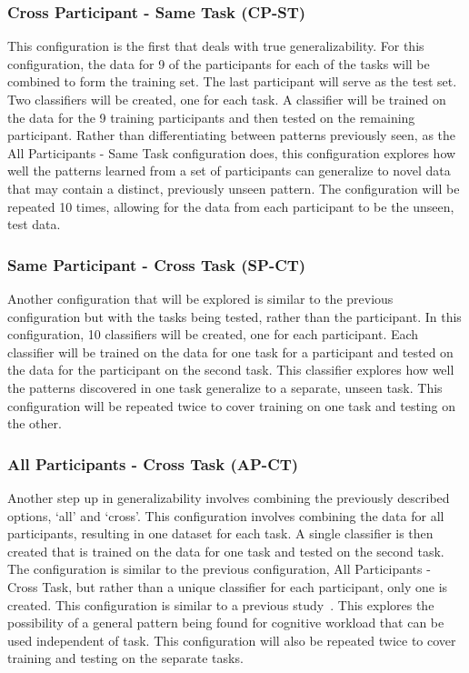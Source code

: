 \documentclass[11pt]{article}
\begin{document}
\subsubsection{Cross Participant - Same Task (CP-ST)}
This configuration is the first that deals with true generalizability. For this configuration, the data for 9 of the participants for each of the tasks will be combined to form the training set. The last participant will serve as the test set. Two classifiers will be created, one for each task. A classifier will be trained on the data for the 9 training participants and then tested on the remaining participant. Rather than differentiating between patterns previously seen, as the All Participants - Same Task configuration does, this configuration explores how well the patterns learned from a set of participants can generalize to novel data that may contain a distinct, previously unseen pattern. The configuration will be repeated 10 times,  allowing for the data from each participant to be the unseen, test data.

\subsubsection{Same Participant - Cross Task (SP-CT)}
Another configuration that will be explored is similar to the previous configuration but with the tasks being tested, rather than the participant. In this configuration, 10 classifiers will be created, one for each participant. Each classifier will be trained on the data for one task for a participant and tested on the data for the participant on the second task. This classifier explores how well the patterns discovered in one task generalize to a separate, unseen task. This configuration will be repeated twice to cover training on one task and testing on the other.

\subsubsection{All Participants - Cross Task (AP-CT)}
Another step up in generalizability involves combining the previously described options, `all' and `cross'. This configuration involves combining the data for all participants, resulting in one dataset for each task. A single classifier is then created that is trained on the data for one task and tested on the second task. The configuration is similar to the previous configuration, All Participants - Cross Task, but rather than a unique classifier for each participant, only one is created. This configuration is similar to a previous study~\cite{Ke}. This explores the possibility of a general pattern being found for cognitive workload that can be used independent of task. This configuration will also be repeated twice to cover training and testing on the separate tasks.
\end{document}
